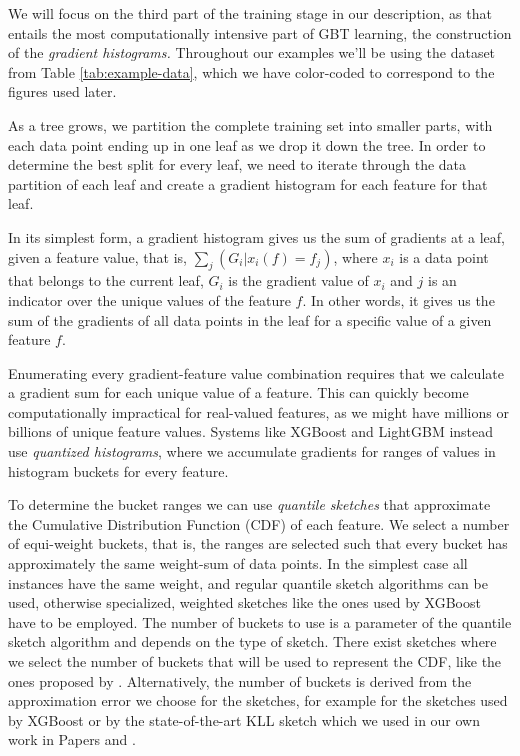 We will focus on the third part of the training stage in our description, as that entails the most
computationally intensive part of GBT learning, the construction of the \emph{gradient histograms.}
Throughout our examples we'll be using the dataset from Table \ref{tab:example-data},
which we have color-coded to correspond to the figures used later.

As a tree grows, we partition the complete training set into smaller parts, with each data
point ending up in one leaf as we drop it down the tree.
In order to determine the best split for every leaf, we need to iterate through the data
partition of each leaf and create a gradient histogram for each feature for that leaf.

In its simplest form, a gradient histogram gives us the sum of gradients at a leaf,
given a feature value, that is, $\sum_{j}(G_i | x_i(f) = f_j)$, where $x_i$ is a data point
that belongs to the current leaf,  $G_i$ is the gradient value of $x_i$ and $j$ is an
indicator over the unique values of the feature $f$. In other words, it gives us the
sum of the gradients of all data points in the leaf for a specific value of a given
feature $f$.

Enumerating every gradient-feature value combination requires that we calculate
a gradient sum for each unique value
of a feature. This can quickly become computationally impractical for real-valued features, as we might have millions or billions of unique feature values.
Systems like XGBoost and LightGBM instead use \emph{quantized histograms},
where we accumulate gradients for ranges of values in histogram buckets for every feature.

To determine the bucket ranges we
can use \emph{quantile sketches} \cite{greenwald2016quantiles} that approximate
the Cumulative Distribution Function (CDF) of each feature. We select a number of
equi-weight buckets, that is, the ranges are selected such that every bucket
has approximately the same weight-sum of data points. In the simplest case
all instances have the same weight, and regular quantile sketch algorithms
can be used, otherwise specialized, weighted sketches like the ones used by XGBoost
have to be employed.
The number of buckets to use is a
parameter of the quantile sketch algorithm and depends on the type of sketch.
There exist sketches where we select the number of buckets that
will be used to represent the CDF, like the ones proposed by \citet{BenHaim2010parallel}.
Alternatively, the number of buckets is derived from the approximation error we choose for the sketches, for example
for the sketches used by XGBoost or by the state-of-the-art KLL sketch \cite{karnin2016kll}
which we used in our own work in Papers \uncertaintreesNum and \blockgbtNum.

